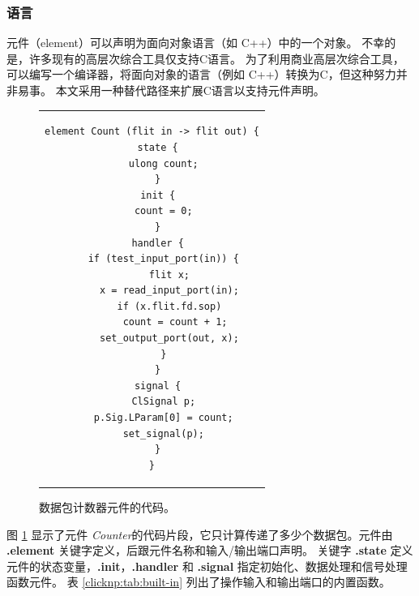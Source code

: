 \subsubsection{语言}


\name 元件（element）可以声明为面向对象语言（如 C++）中的一个对象。
不幸的是，许多现有的高层次综合工具仅支持C语言。
为了利用商业高层次综合工具，可以编写一个编译器，将面向对象的语言（例如 C++）转换为C，但这种努力并非易事。
本文采用一种替代路径来扩展C语言以支持元件声明。




\begin{figure}[htbp]
\small
\centering
\begin{tabular}{c}
\begin{lstlisting}
element Count (flit in -> flit out) {
  state {
    ulong count;
  }
  init {
    count = 0;
  }
  handler {
    if (test_input_port(in)) {
      flit x;
      x = read_input_port(in);
      if (x.flit.fd.sop)
        count = count + 1;
      set_output_port(out, x);
    }
  }
  signal {
    ClSignal p;
    p.Sig.LParam[0] = count;
    set_signal(p);
  }
}
\end{lstlisting}
\end{tabular}
	\caption{数据包计数器元件的代码。}
	\label{clicknp:fig:count-element}
\end{figure}


图 \ref{clicknp:fig:count-element} 显示了元件 \textit {Counter}的代码片段，它只计算传递了多少个数据包。元件由 \textbf {.element} 关键字定义，后跟元件名称和输入/输出端口声明。
关键字 \textbf {.state} 定义元件的状态变量，\textbf {.init}，\textbf {.handler} 和 \textbf {.signal} 指定初始化、数据处理和信号处理函数元件。
表 \ref {clicknp:tab:built-in} 列出了操作输入和输出端口的内置函数。


